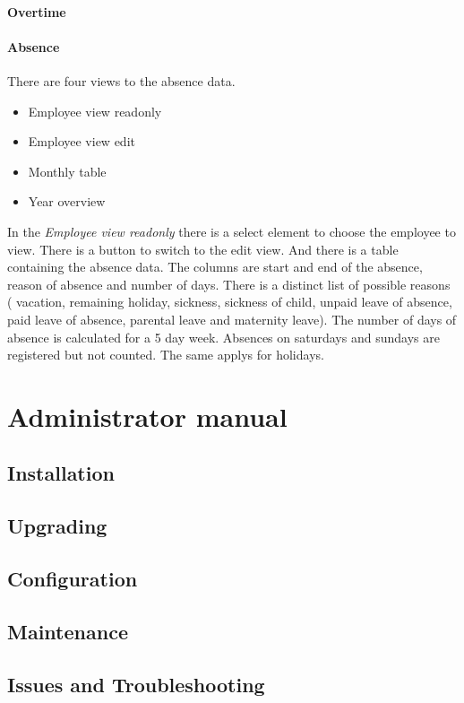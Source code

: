 \documentclass[12pt,a4paper,titlepage]{report}
\begin{document}
\subsubsection{Overtime}
\subsubsection{Absence}
There are four views to the absence data.
\begin{itemize}
\item Employee view readonly
\item Employee view edit
\item Monthly table
\item Year overview
\end{itemize}
In the \emph{Employee view readonly} there is a select element to choose the employee to view. There is a button to switch to the edit view.
And there is a table containing the absence data. The columns are start and end of the absence, reason of absence and number of days.
There is a distinct list of possible reasons ( vacation,
        remaining holiday,
       sickness,
        sickness of child,
        unpaid leave of absence,
        paid leave of absence,
        parental leave and
        maternity leave).
The number of days of absence is calculated for a 5 day week. Absences on saturdays and sundays are registered but not counted. The same applys for holidays.


\chapter{Administrator manual}
\section{Installation}\label{sec:installation}
\section{Upgrading}
\section{Configuration}
\section{Maintenance}
\section{Issues and Troubleshooting}
\end{document}
